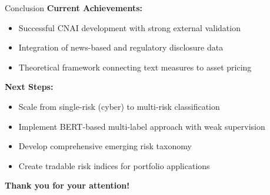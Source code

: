 \documentclass[aspectratio=169]{beamer}
\begin{document}
\begin{frame}{Conclusion}
\textbf{Current Achievements:}
\begin{itemize}
    \item Successful CNAI development with strong external validation
    \item Integration of news-based and regulatory disclosure data
    \item Theoretical framework connecting text measures to asset pricing
\end{itemize}

\textbf{Next Steps:}
\begin{itemize}
    \item Scale from single-risk (cyber) to multi-risk classification
    \item Implement BERT-based multi-label approach with weak supervision
    \item Develop comprehensive emerging risk taxonomy
    \item Create tradable risk indices for portfolio applications
\end{itemize}

\vspace{0.5cm}
\begin{center}
\textbf{Thank you for your attention!}
\end{center}
\end{frame}
%
%
\end{document}
